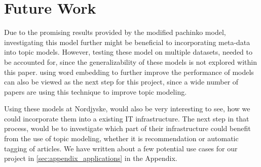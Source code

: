 \section{Future Work}\label{sec:future_work}
Due to the promising results provided by the modified pachinko model, investigating this model further might be beneficial to incorporating meta-data into topic models.
However, testing these model on multiple datasets, needed to be accounted for, since the generalizability of these models is not explored within this paper.
using word embedding to further improve the performance of models can also be viewed as the next step for this project, since a wide number of papers are using this technique to improve topic modeling.

Using these models at Nordjyske, would also be very interesting to see, how we could incorporate them into a existing IT infrastructure.
The next step in that process, would be to investigate which part of their infrastructure could benefit from the use of topic modeling, whether it is recommendation or automatic tagging of articles. 
We have written about a few potential use cases for our project in \ref{sec:appendix_applications} in the Appendix. 